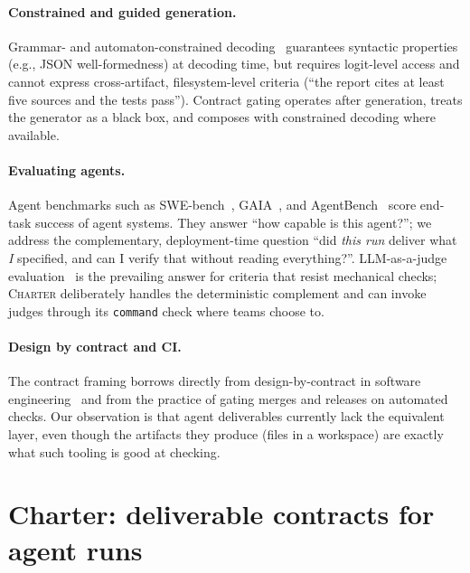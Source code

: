 \documentclass{article}
\begin{document}
\paragraph{Constrained and guided generation.} Grammar- and automaton-constrained
decoding~\citep{willard2023outlines} guarantees syntactic properties (e.g.,
JSON well-formedness) at decoding time, but requires logit-level access and
cannot express cross-artifact, filesystem-level criteria (``the report cites at
least five sources and the tests pass''). Contract gating operates after
generation, treats the generator as a black box, and composes with constrained
decoding where available.

\paragraph{Evaluating agents.} Agent benchmarks such as
SWE-bench~\citep{jimenez2024swebench}, GAIA~\citep{mialon2023gaia}, and
AgentBench~\citep{liu2023agentbench} score end-task success of agent systems.
They answer ``how capable is this agent?''; we address the complementary,
deployment-time question ``did \emph{this run} deliver what \emph{I} specified,
and can I verify that without reading everything?''. LLM-as-a-judge
evaluation~\citep{zheng2023judging} is the prevailing answer for criteria that
resist mechanical checks; \textsc{Charter} deliberately handles the deterministic
complement and can invoke judges through its \texttt{command} check where teams
choose to.

\paragraph{Design by contract and CI.} The contract framing borrows directly from
design-by-contract in software engineering~\citep{meyer1992dbc} and from the
practice of gating merges and releases on automated checks. Our observation is
that agent deliverables currently lack the equivalent layer, even though the
artifacts they produce (files in a workspace) are exactly what such tooling is
good at checking.

\section{Charter: deliverable contracts for agent runs}
\label{sec:design}
\end{document}
